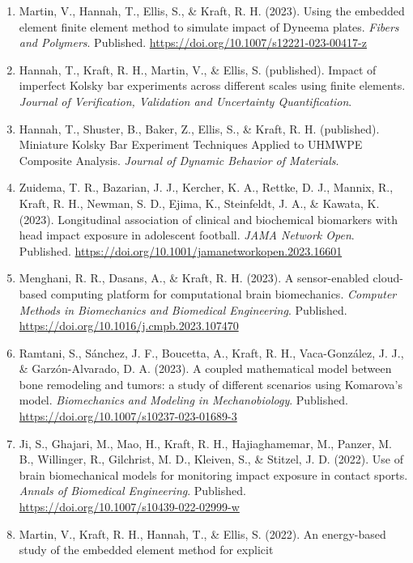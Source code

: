 \documentclass[
]{article}
\begin{document}
\begin{enumerate}
\def\labelenumi{\arabic{enumi}.}
\item
  Martin, V., Hannah, T., Ellis, S., \& Kraft, R. H. (2023). Using the
  embedded element finite element method to simulate impact of Dyneema
  plates. \emph{Fibers and Polymers}. Published.
  \url{https://doi.org/10.1007/s12221-023-00417-z}
\item
  Hannah, T., Kraft, R. H., Martin, V., \& Ellis, S. (published). Impact
  of imperfect Kolsky bar experiments across different scales using
  finite elements. \emph{Journal of Verification, Validation and
  Uncertainty Quantification}.
\item
  Hannah, T., Shuster, B., Baker, Z., Ellis, S., \& Kraft, R. H.
  (published). Miniature Kolsky Bar Experiment Techniques Applied to
  UHMWPE Composite Analysis. \emph{Journal of Dynamic Behavior of
  Materials}.
\item
  Zuidema, T. R., Bazarian, J. J., Kercher, K. A., Rettke, D. J.,
  Mannix, R., Kraft, R. H., Newman, S. D., Ejima, K., Steinfeldt, J. A.,
  \& Kawata, K. (2023). Longitudinal association of clinical and
  biochemical biomarkers with head impact exposure in adolescent
  football. \emph{JAMA Network Open}. Published.
  \url{https://doi.org/10.1001/jamanetworkopen.2023.16601}
\item
  Menghani, R. R., Dasans, A., \& Kraft, R. H. (2023). A sensor-enabled
  cloud-based computing platform for computational brain biomechanics.
  \emph{Computer Methods in Biomechanics and Biomedical Engineering}.
  Published. \url{https://doi.org/10.1016/j.cmpb.2023.107470}
\item
  Ramtani, S., Sánchez, J. F., Boucetta, A., Kraft, R. H.,
  Vaca-González, J. J., \& Garzón-Alvarado, D. A. (2023). A coupled
  mathematical model between bone remodeling and tumors: a study of
  different scenarios using Komarova's model. \emph{Biomechanics and
  Modeling in Mechanobiology}. Published.
  \url{https://doi.org/10.1007/s10237-023-01689-3}
\item
  Ji, S., Ghajari, M., Mao, H., Kraft, R. H., Hajiaghamemar, M., Panzer,
  M. B., Willinger, R., Gilchrist, M. D., Kleiven, S., \& Stitzel, J. D.
  (2022). Use of brain biomechanical models for monitoring impact
  exposure in contact sports. \emph{Annals of Biomedical Engineering}.
  Published. \url{https://doi.org/10.1007/s10439-022-02999-w}
\item
  Martin, V., Kraft, R. H., Hannah, T., \& Ellis, S. (2022). An
  energy-based study of the embedded element method for explicit

\end{enumerate}
\end{document}
